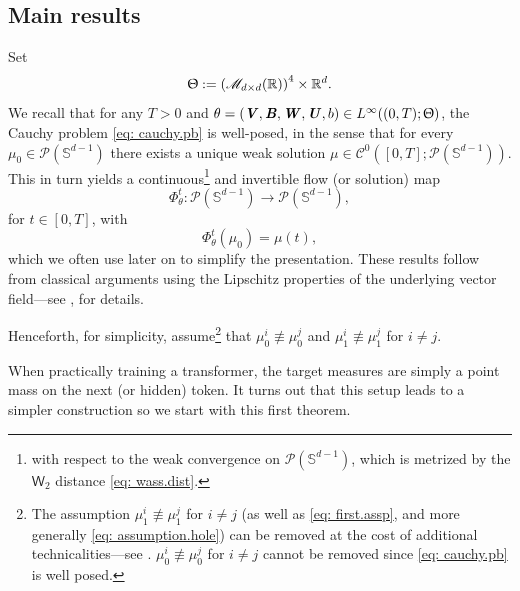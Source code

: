 \documentclass[a4paper,11pt]{article}
\theoremstyle{plain}
\newcommand{\R}{\mathbb{R}}
\renewcommand{\S}{\mathbb{S}^{d-1}}
\newcommand{\bW}{\bm{\mathit{W}}}
\newcommand{\bV}{\bm{\mathit{V}}}
\newcommand{\bB}{\bm{\mathit{B}}}
\newcommand{\bU}{\bm{\mathit{U}}}
\renewcommand{\sec}{\textsection}
\numberwithin{equation}{section}
\begin{document}
\subsection{Main results} 

Set
\begin{equation*}
\Uptheta:=\left(\mathscr{M}_{d\times d}(\R)\right)^4\times \R^d. 
\end{equation*}
We recall that for any $T>0$ and $\theta=(\bV,\bB,\bW,\bU, b)\in L^\infty((0,T);\Uptheta)$, the Cauchy problem \eqref{eq: cauchy.pb} is well-posed, in the sense that for every $\mu_0\in\mathscr{P}(\S)$ there exists a unique weak solution $\mu\in \mathscr{C}^0([0,T];\mathscr{P}(\S))$. This in turn yields a continuous\footnote{with respect to the weak convergence on $\mathscr{P}(\S)$, which is metrized by the $\mathsf{W}_2$ distance \eqref{eq: wass.dist}.} and invertible flow (or solution) map 
$$\Phi^t_\theta:\mathscr{P}(\S)\to\mathscr{P}(\S),$$
for $t\in[0,T]$, with 
$$\Phi^t_\theta(\mu_0) = \mu(t),$$ 
which we often use later on to simplify the presentation.
These results follow from  classical arguments using the Lipschitz properties of the underlying vector field---see \cite[\sec 6]{geshkovski2024emergence}, \cite{paul2022microscopic} for details.

Henceforth, for simplicity, assume\footnote{The assumption $\mu_1^i\not\equiv\mu_1^j$ for $i\neq j$ (as well as \eqref{eq: first.assp}, and more generally \eqref{eq: assumption.hole}) can be removed at the cost of additional technicalities---see {\bf {}}. $\mu_0^i\not\equiv\mu_0^j$ for $i\neq j$ cannot be removed since \eqref{eq: cauchy.pb} is well posed.} that $\mu_0^i\not\equiv\mu_0^j$ and $\mu_1^i\not\equiv\mu_1^j$ for $i\neq j$.

When practically training a transformer, the target measures are simply a point mass on the next (or hidden) token. It turns out that this setup leads to a simpler construction so we start with this first theorem.
\end{document}
